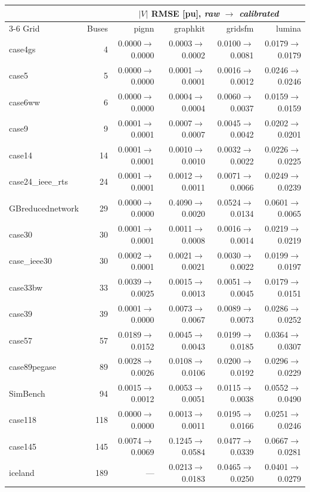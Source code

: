 \documentclass[10pt]{article}
\begin{document}
\begin{longtable}{lrrrrr}
\toprule
& & \multicolumn{4}{c}{$|V|$ RMSE [pu], \emph{raw $\to$ calibrated}} \\
\cmidrule(lr){3-6}
Grid & Buses & pignn & graphkit & gridsfm & lumina \\
\midrule
\endhead
case4gs & 4 & 0.0000$\to$0.0000 & 0.0003$\to$0.0002 & 0.0100$\to$0.0081 & 0.0179$\to$0.0179 \\
case5 & 5 & 0.0000$\to$0.0000 & 0.0001$\to$0.0001 & 0.0016$\to$0.0012 & 0.0246$\to$0.0246 \\
case6ww & 6 & 0.0000$\to$0.0000 & 0.0004$\to$0.0004 & 0.0060$\to$0.0037 & 0.0159$\to$0.0159 \\
case9 & 9 & 0.0001$\to$0.0001 & 0.0007$\to$0.0007 & 0.0045$\to$0.0042 & 0.0202$\to$0.0201 \\
case14 & 14 & 0.0001$\to$0.0001 & 0.0010$\to$0.0010 & 0.0032$\to$0.0022 & 0.0226$\to$0.0225 \\
case24\_ieee\_rts & 24 & 0.0001$\to$0.0001 & 0.0012$\to$0.0011 & 0.0071$\to$0.0066 & 0.0249$\to$0.0239 \\
GBreducednetwork & 29 & 0.0000$\to$0.0000 & 0.4090$\to$0.0020 & 0.0524$\to$0.0134 & 0.0601$\to$0.0065 \\
case30 & 30 & 0.0001$\to$0.0001 & 0.0011$\to$0.0008 & 0.0016$\to$0.0014 & 0.0219$\to$0.0219 \\
case\_ieee30 & 30 & 0.0002$\to$0.0001 & 0.0021$\to$0.0021 & 0.0030$\to$0.0022 & 0.0199$\to$0.0197 \\
case33bw & 33 & 0.0039$\to$0.0025 & 0.0015$\to$0.0013 & 0.0051$\to$0.0045 & 0.0179$\to$0.0151 \\
case39 & 39 & 0.0001$\to$0.0000 & 0.0073$\to$0.0067 & 0.0089$\to$0.0073 & 0.0286$\to$0.0252 \\
case57 & 57 & 0.0189$\to$0.0152 & 0.0045$\to$0.0043 & 0.0199$\to$0.0185 & 0.0364$\to$0.0307 \\
case89pegase & 89 & 0.0028$\to$0.0026 & 0.0108$\to$0.0106 & 0.0200$\to$0.0192 & 0.0296$\to$0.0229 \\
SimBench & 94 & 0.0015$\to$0.0012 & 0.0053$\to$0.0051 & 0.0115$\to$0.0038 & 0.0552$\to$0.0490 \\
case118 & 118 & 0.0000$\to$0.0000 & 0.0013$\to$0.0011 & 0.0195$\to$0.0166 & 0.0251$\to$0.0246 \\
case145 & 145 & 0.0074$\to$0.0069 & 0.1245$\to$0.0584 & 0.0477$\to$0.0339 & 0.0667$\to$0.0281 \\
iceland & 189 & --- & 0.0213$\to$0.0183 & 0.0465$\to$0.0250 & 0.0401$\to$0.0279 \\

\end{longtable}
\end{document}
